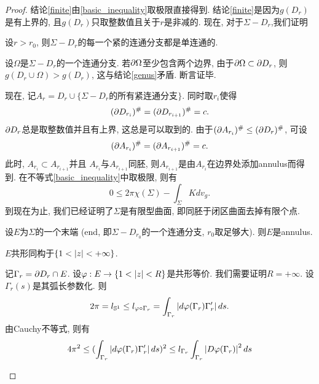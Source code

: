 \begin{proof}
    结论\eqref{finite}由\eqref{basic_inequality}取极限直接得到. 结论\eqref{finite}是因为$g(D_r)$是有上界的, 且$g(D_r)$只取整数值且关于$r$是非减的. 现在, 对于$\Sigma - D_r$,我们证明
    \begin{claim}
        设$r > r_0$, 则$\Sigma - D_r$的每一个紧的连通分支都是单连通的.
        \begin{subproof}
            设$\Omega$是$\Sigma - D_r$的一个连通分支. 若$\P \Omega$至少包含两个边界, 由于$\P \Omega \subset \P D_r$, 则$g(D_r \cup \Omega) > g(D_r)$, 这与结论\eqref{genus}矛盾. 断言证毕.
        \end{subproof}
    \end{claim}
    \par 现在, 记$A_r=D_r\cup \{\Sigma - D_r\text{的所有紧连通分支}\}$. 同时取$r_i$使得
    \begin{equation}
        (\P D_{r_i})^\# = (\P D_{r_{i+1}})^\#=c.
    \end{equation}
    $\P D_{r}$总是取整数值并且有上界, 这总是可以取到的. 由于$(\P A_{r_i})^\# \le (\P D_r)^\#$, 可设
    \begin{equation}
        (\P A_{r_i})^\# = (\P A_{r_{i+1}})^\#=c.
    \end{equation}
    此时, $A_{r_i} \subset A_{r_{i+1}}$并且 $A_{r_i}$与$A_{r_{i+1}}$同胚, 则$A_{r_{i+1}}$是由$A_{r_i}$在边界处添加annulus而得到. 在不等式\eqref{basic_inequality}中取极限, 则有
    \begin{equation}
        0 \le 2\pi \chi(\Sigma) - \int_\Sigma K dv_g.
    \end{equation}
    到现在为止, 我们已经证明了$\Sigma$是有限型曲面, 即同胚于闭区曲面去掉有限个点.
    \par 设$E$为$\Sigma$的一个末端 (end, 即$\Sigma-D_{r_0}$的一个连通分支, $r_0$取足够大). 则$E$是annulus. 
    \begin{claim}
        $E$共形同构于$\{1 < \abs{z} < +\infty\}$.
        \begin{subproof}
            记$\Gamma_r=\P D_r \cap E$. 设$\phi: E \to \{ 1 < \abs{z} < R\}$是共形等价. 我们需要证明$R=+\infty$. 设$\Gamma_r(s)$是其弧长参数化. 则
            \begin{equation}
                2\pi = l_{\S^1} \le l_{\phi\circ \Gamma_r} = \int_{\Gamma_r} \abs{d \phi(\Gamma_r)\Gamma'_r}ds.
            \end{equation}
            由Cauchy不等式, 则有
            \begin{equation}
                \begin{split}
                    4\pi^2 \le (\int_{\Gamma_r} \abs{d\phi(\Gamma_r)\Gamma'_r}ds)^2 & \le l_{\Gamma_r}\int_{\Gamma_r}\abs{D\phi(\Gamma_r)}^2ds \\

\end{split}
\end{equation}
\end{subproof}
\end{claim}
\end{proof}
